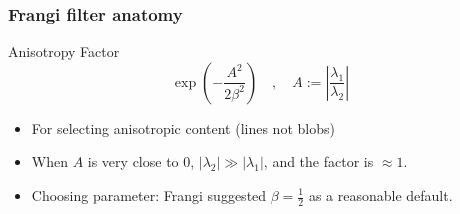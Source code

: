 \documentclass[9pt,notes]{beamer}
\begin{document}
\begin{frame}
\frametitle[Anisotropy Factor]{Frangi filter anatomy}
\begin{block}{Anisotropy Factor}
\begin{equation}
\exp\left(-\frac{A^2}{2\beta^2}\right) \quad,\quad
A := \left|\frac{\lambda_1}{\lambda_2}\right|
\end{equation}
\end{block}
\begin{itemize}
  \item For selecting anisotropic content (lines not blobs)
  \item When $A$ is very close to 0,
  $\left|\lambda_2\right| \gg \left|\lambda_1\right|$, and the factor is $\approx 1$.
  \item Choosing parameter: Frangi suggested $\beta=\frac{1}{2}$ as a reasonable default.
\end{itemize}
\begin{figure} \centering
\end{figure}
\end{frame}
\end{document}
